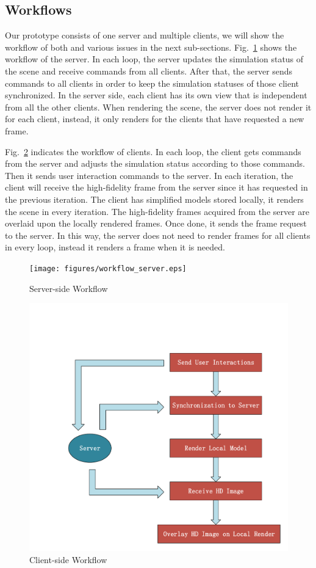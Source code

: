 \subsection{Workflows}

Our prototype consists of one server and multiple clients, we will show the workflow of both and various issues in the next sub-sections.
Fig.~\ref{fig:s-wf} shows the workflow of the server.
In each loop, the server updates the simulation status of the scene and receive commands from all clients.
After that, the server sends commands to all clients in order to keep the simulation statuses of those client synchronized.
In the server side, each client has its own view that is independent from all the other clients.
When rendering the scene, the server does not render it for each client, instead, it only renders for the clients that have requested a new frame.

Fig.~\ref{fig:c-wf} indicates the workflow of clients. In each loop, the client gets commands from the server and adjusts the simulation status according to those commands. Then it sends user interaction commands to the server. In each iteration, the client will receive the high-fidelity frame from the server since it has requested in the previous iteration. The client has simplified models stored locally, it renders the scene in every iteration. The high-fidelity frames acquired from the server are overlaid upon the locally rendered frames. Once done, it sends the frame request to the server. In this way, the server does not need to render frames for all clients in every loop, instead it renders a frame when it is needed.

\begin{figure}[!htbp]
	\centering
	\texttt{[image: figures/workflow\_server.eps]}
	\caption{Server-side Workflow}
	\label{fig:s-wf}
\end{figure}

\begin{figure}[!htbp]
	\centering
	\includegraphics[width=0.7\columnwidth]{figures/workflow_client.pdf}
	\caption{Client-side Workflow}
	\label{fig:c-wf}
\end{figure}

